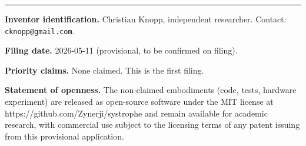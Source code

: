 \documentclass[11pt,a4paper]{article}
\begin{document}
\bigskip
\hrule
\bigskip

\noindent\textbf{Inventor identification.} Christian Knopp, independent researcher. Contact: \texttt{cknopp@gmail.com}.

\noindent\textbf{Filing date.} 2026-05-11 (provisional, to be confirmed on filing).

\noindent\textbf{Priority claims.} None claimed. This is the first filing.

\noindent\textbf{Statement of openness.} The non-claimed embodiments (code, tests, hardware experiment) are released as open-source software under the MIT license at https://github.com/Zynerji/systrophe and remain available for academic research, with commercial use subject to the licensing terms of any patent issuing from this provisional application.
\end{document}

